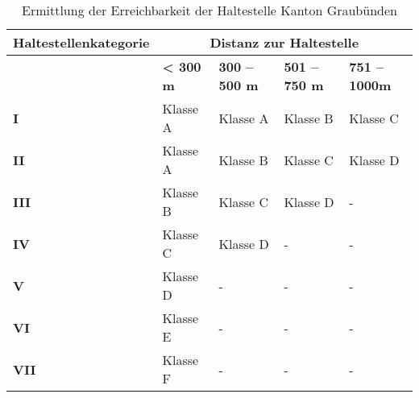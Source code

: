\begin{table}[ht]
    \begin{tabular}[c]{l p{2.5cm} p{2.5cm} p{2.5cm} p{2.5cm}}
        \toprule
        \textbf{Haltestellenkategorie}
                                & \multicolumn{4}{c}{\textbf{Distanz zur Haltestelle}}\\
        \midrule
        \textbf{}
                                & \textbf{< 300 m}
                                & \textbf{300 -- 500 m}
                                & \textbf{501 -- 750 m}
                                & \textbf{751 -- 1000m}\\
        \textbf{I}
                                & Klasse A
                                & Klasse A
                                & Klasse B
                                & Klasse C\\
        \textbf{II}
                                & Klasse A
                                & Klasse B
                                & Klasse C
                                & Klasse D\\
        \textbf{III}
                                & Klasse B
                                & Klasse C
                                & Klasse D
                                & -\\
        \textbf{IV}
                                & Klasse C
                                & Klasse D
                                & -
                                & -\\
        \textbf{V}
                                & Klasse D
                                & -
                                & -
                                & -\\
        \cellcolor{red!25}\textbf{VI}
                                & \cellcolor{red!25}Klasse E
                                & -
                                & -
                                & -\\
        \cellcolor{red!25}\textbf{VII}
                                & \cellcolor{red!25}Klasse F
                                & -
                                & -
                                & -\\                                
        \bottomrule
    \end{tabular}
    \caption{Ermittlung der Erreichbarkeit der Haltestelle Kanton Graubünden}
    \label{table:Ermittlung Erreichbarkeit der Haltestelle Kanton Graubünden}
\end{table}

